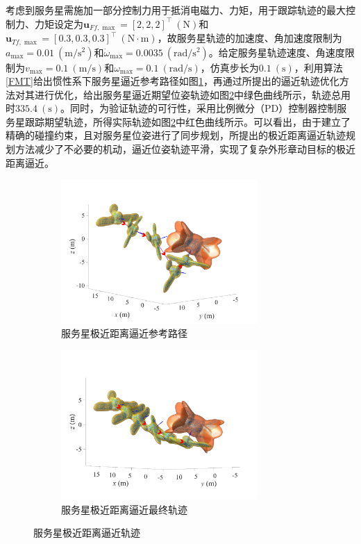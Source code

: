 \documentclass[lang=chs, degree=master, blindreview=false, winfonts=true]{yanputhesis}
\begin{document}
考虑到服务星需施加一部分控制力用于抵消电磁力、力矩，用于跟踪轨迹的最大控制力、力矩设定为$\boldsymbol{u}_{Ff,\max}={\left[2,2,2\right]^{\top}}\ (\mathrm{N})$和$\boldsymbol{u}_{Tf,\max}={\left[0.3,0.3,0.3\right]^{\top}}\ (\mathrm{N\cdot m})$，故服务星轨迹的加速度、角加速度限制为$a_{\max}=0.01\ (\mathrm{m/s^2})$和$\dot{\omega}_{\max}=0.0035\ (\mathrm{rad/s^2})$。给定服务星轨迹速度、角速度限制为$v_{\max}=0.1\ (\mathrm{m/s})$和${\omega}_{\max}=0.1\ (\mathrm{rad/s})$，仿真步长为$0.1\ (\mathrm{s})$，利用算法\ref{FMT}给出惯性系下服务星逼近参考路径如图\ref{fig.fmtpath}，再通过所提出的逼近轨迹优化方法对其进行优化，给出服务星逼近期望位姿轨迹如图\ref{fig.proximity-tra}中绿色曲线所示，轨迹总用时$335.4\ (\mathrm{s})$。同时，为验证轨迹的可行性，采用比例微分（PD）控制器控制服务星跟踪期望轨迹，所得实际轨迹如图\ref{fig.proximity-tra}中红色曲线所示。可以看出，由于建立了精确的碰撞约束，且对服务星位姿进行了同步规划，所提出的极近距离逼近轨迹规划方法减少了不必要的机动，逼近位姿轨迹平滑，实现了复杂外形章动目标的极近距离逼近。

\begin{figure}[htb!]
	\centering
	\begin{minipage}[t]{0.96\textwidth}
		\centering
		\begin{subfigure}[t]{0.47\textwidth}
			\centering
			\includegraphics[width = 2.95in]{picture/FMT_path.pdf}
			\caption{服务星极近距离逼近参考路径\label{fig.fmtpath}}
		\end{subfigure}\hfill
		\begin{subfigure}[t]{0.47\textwidth}
			\centering
			\includegraphics[width = 2.95in]{picture/proximity_tra.pdf}
			\caption{服务星极近距离逼近最终轨迹\label{fig.proximity-tra}}
		\end{subfigure}
	\end{minipage}
	\caption{服务星极近距离逼近轨迹\label{Fig.proximity-tra}}
\end{figure}
\end{document}
